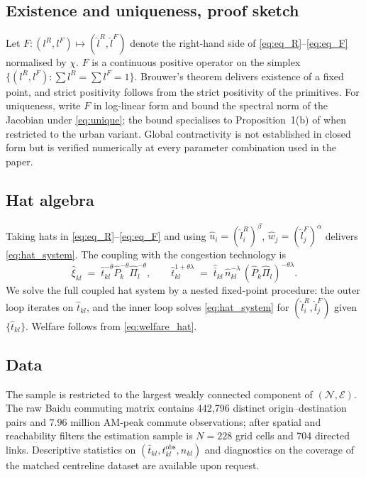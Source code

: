 \documentclass[12pt]{article}
\newcommand{\N}{\mathcal N}
\newcommand{\E}{\mathcal E}
\newcommand{\tbar}{\bar t}
\newcommand{\tkl}{t_{kl}}
\newcommand{\obs}{\mathrm{obs}}
\begin{document}
\subsection{Existence and uniqueness, proof sketch}\label{app:exist}

Let $F:(l^R,l^F)\mapsto(\hat l^R,\hat l^F)$ denote the right-hand side
of \eqref{eq:eq_R}--\eqref{eq:eq_F} normalised by $\chi$.  $F$ is a
continuous positive operator on the simplex $\{(l^R,l^F):\sum l^R=
\sum l^F=1\}$.  Brouwer's theorem delivers existence of a fixed
point, and strict positivity follows from the strict positivity of
the primitives.  For uniqueness, write $F$ in log-linear form and
bound the spectral norm of the Jacobian under \eqref{eq:unique}; the
bound specialises to Proposition~1(b) of \citet{AllenArkolakis2022}
when restricted to the urban variant.  Global contractivity is not
established in closed form but is verified numerically at every
parameter combination used in the paper.

\subsection{Hat algebra}\label{app:hat}

Taking hats in \eqref{eq:eq_R}--\eqref{eq:eq_F} and using
$\hat u_i=(\hat l_i^R)^{\beta}$, $\hat w_j=(\hat l_j^F)^{\alpha}$
delivers \eqref{eq:hat_system}.  The coupling with the congestion
technology is
\[
  \hat\xi_{kl}\;=\;\hat\tkl^{-\theta}\hat P_k^{-\theta}\hat\Pi_l^{-\theta},
  \qquad
  \hat\tkl^{1+\theta\lambda}
  \;=\;\hat{\tbar}_{kl}\,\hat n_{kl}^{-\lambda}\,(\hat P_k\hat\Pi_l)^{-\theta\lambda}.
\]
We solve the full coupled hat system by a nested fixed-point
procedure: the outer loop iterates on $\hat\tkl$, and the inner loop
solves \eqref{eq:hat_system} for $(\hat l_i^R,\hat l_j^F)$ given
$\{\hat\tkl\}$.  Welfare follows from \eqref{eq:welfare_hat}.

\subsection{Data}\label{app:data}

The sample is restricted to the largest weakly connected component
of $(\N,\E)$.  The raw Baidu commuting matrix contains 442{,}796
distinct origin--destination pairs and $7.96$ million AM-peak commute
observations; after spatial and reachability filters the estimation
sample is $N=228$ grid cells and 704 directed links.  Descriptive
statistics on $(\tbar_{kl},\tkl^{\obs},n_{kl})$ and diagnostics on
the coverage of the matched centreline dataset are available upon
request.
\end{document}
